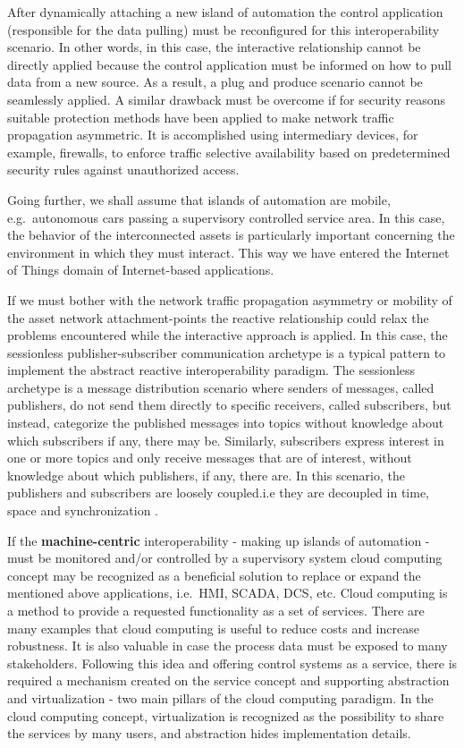 \documentclass[
]{article}
\begin{document}
After dynamically attaching a new island of automation the control
application (responsible for the data pulling) must be reconfigured for
this interoperability scenario. In other words, in this case, the
interactive relationship cannot be directly applied because the control
application must be informed on how to pull data from a new source. As a
result, a plug and produce scenario cannot be seamlessly applied. A
similar drawback must be overcome if for security reasons suitable
protection methods have been applied to make network traffic propagation
asymmetric. It is accomplished using intermediary devices, for example,
firewalls, to enforce traffic selective availability based on
predetermined security rules against unauthorized access.

Going further, we shall assume that islands of automation are mobile,
e.g.~autonomous cars passing a supervisory controlled service area. In
this case, the behavior of the interconnected assets is particularly
important concerning the environment in which they must interact. This
way we have entered the Internet of Things domain of Internet-based
applications.

If we must bother with the network traffic propagation asymmetry or
mobility of the asset network attachment-points the reactive
relationship could relax the problems encountered while the interactive
approach is applied. In this case, the sessionless publisher-subscriber
communication archetype is a typical pattern to implement the abstract
reactive interoperability paradigm. The sessionless archetype is a
message distribution scenario where senders of messages, called
publishers, do not send them directly to specific receivers, called
subscribers, but instead, categorize the published messages into topics
without knowledge about which subscribers if any, there may be.
Similarly, subscribers express interest in one or more topics and only
receive messages that are of interest, without knowledge about which
publishers, if any, there are. In this scenario, the publishers and
subscribers are loosely coupled.i.e they are decoupled in time, space
and synchronization \cite{RefWorks:doc:5c44e246e4b0591b15ea9e59}.

If the \textbf{machine-centric} interoperability - making up islands of
automation - must be monitored and/or controlled by a supervisory system
cloud computing concept may be recognized as a beneficial solution to
replace or expand the mentioned above applications, i.e.~HMI, SCADA,
DCS, etc. Cloud computing is a method to provide a requested
functionality as a set of services. There are many examples that cloud
computing is useful to reduce costs and increase robustness. It is also
valuable in case the process data must be exposed to many stakeholders.
Following this idea and offering control systems as a service, there is
required a mechanism created on the service concept and supporting
abstraction and virtualization - two main pillars of the cloud computing
paradigm. In the cloud computing concept, virtualization is recognized
as the possibility to share the services by many users, and abstraction
hides implementation details.
\end{document}
